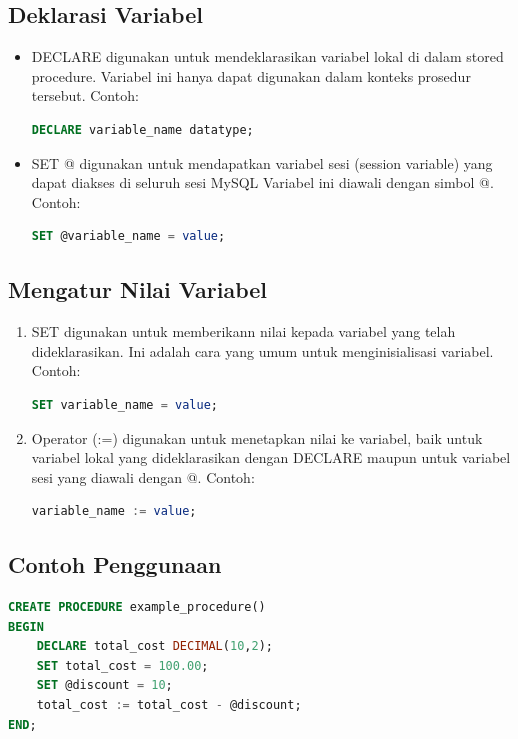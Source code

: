 \documentclass{article}
\begin{document}
\subsection{Deklarasi Variabel}
\begin{itemize}
    \item DECLARE digunakan untuk mendeklarasikan variabel lokal di dalam stored procedure. Variabel ini hanya dapat digunakan dalam konteks prosedur tersebut. Contoh:
          \begin{lstlisting}[language=SQL, caption={}, captionpos=b]
    DECLARE variable_name datatype;
    \end{lstlisting}
    \item SET @ digunakan untuk mendapatkan variabel sesi (session variable) yang dapat diakses di seluruh sesi MySQL Variabel ini diawali dengan simbol @. Contoh:
          \begin{lstlisting}[language=SQL, caption={}, captionpos=b]
    SET @variable_name = value;
    \end{lstlisting}
\end{itemize}

\subsection{Mengatur Nilai Variabel}
\begin{enumerate}
    \item SET digunakan untuk memberikann nilai kepada variabel yang telah dideklarasikan. Ini adalah cara yang umum untuk menginisialisasi variabel. Contoh:
          \begin{lstlisting}[language=SQL, caption={}, captionpos=b]
    SET variable_name = value;
    \end{lstlisting}
    \item Operator (:=) digunakan untuk menetapkan nilai ke variabel, baik untuk variabel lokal yang dideklarasikan dengan DECLARE maupun untuk variabel sesi yang diawali dengan @. Contoh:
          \begin{lstlisting}[language=SQL, caption={}, captionpos=b]
    variable_name := value;
    \end{lstlisting}
\end{enumerate}

\subsection{Contoh Penggunaan}
\begin{lstlisting}[language=SQL, caption={}, captionpos=b]
CREATE PROCEDURE example_procedure()
BEGIN
    DECLARE total_cost DECIMAL(10,2);
    SET total_cost = 100.00;
    SET @discount = 10;
    total_cost := total_cost - @discount;
END;
\end{lstlisting}
\end{document}
